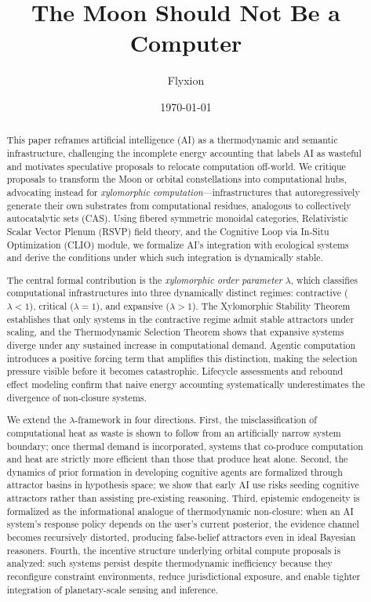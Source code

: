 \documentclass[11pt,a4paper]{article}
\title{The Moon Should Not Be a Computer}
\author{Flyxion}
\date{\today}
\theoremstyle{plain}
\theoremstyle{definition}
\theoremstyle{remark}
\begin{document}
\maketitle

\begin{abstract}
This paper reframes artificial intelligence (AI) as a thermodynamic and
semantic infrastructure, challenging the incomplete energy accounting that labels
AI as wasteful and motivates speculative proposals to relocate computation
off-world. We critique proposals to transform the Moon or orbital constellations
into computational hubs, advocating instead for \emph{xylomorphic
computation}---infrastructures that autoregressively generate their own
substrates from computational residues, analogous to collectively autocatalytic
sets (CAS). Using fibered symmetric monoidal categories, Relativistic Scalar
Vector Plenum (RSVP) field theory, and the Cognitive Loop via In-Situ
Optimization (CLIO) module, we formalize AI's integration with ecological
systems and derive the conditions under which such integration is dynamically
stable.

The central formal contribution is the \emph{xylomorphic order parameter}
$\lambda$, which classifies computational infrastructures into three dynamically
distinct regimes: contractive ($\lambda < 1$), critical ($\lambda = 1$), and
expansive ($\lambda > 1$). The Xylomorphic Stability Theorem establishes that
only systems in the contractive regime admit stable attractors under scaling, and
the Thermodynamic Selection Theorem shows that expansive systems diverge under
any sustained increase in computational demand. Agentic computation introduces a
positive forcing term that amplifies this distinction, making the selection
pressure visible before it becomes catastrophic. Lifecycle assessments and
rebound effect modeling confirm that naive energy accounting systematically
underestimates the divergence of non-closure systems.

We extend the $\lambda$-framework in four directions. First, the
misclassification of computational heat as waste is shown to follow from an
artificially narrow system boundary; once thermal demand is incorporated, systems
that co-produce computation and heat are strictly more efficient than those that
produce heat alone. Second, the dynamics of prior formation in developing
cognitive agents are formalized through attractor basins in hypothesis space; we
show that early AI use risks seeding cognitive attractors rather than assisting
pre-existing reasoning. Third, epistemic endogeneity is formalized as the
informational analogue of thermodynamic non-closure: when an AI system's response
policy depends on the user's current posterior, the evidence channel becomes
recursively distorted, producing false-belief attractors even in ideal Bayesian
reasoners. Fourth, the incentive structure underlying orbital compute proposals
is analyzed: such systems persist despite thermodynamic inefficiency because they
reconfigure constraint environments, reduce jurisdictional exposure, and enable
tighter integration of planetary-scale sensing and inference.


\end{abstract}
\end{document}
